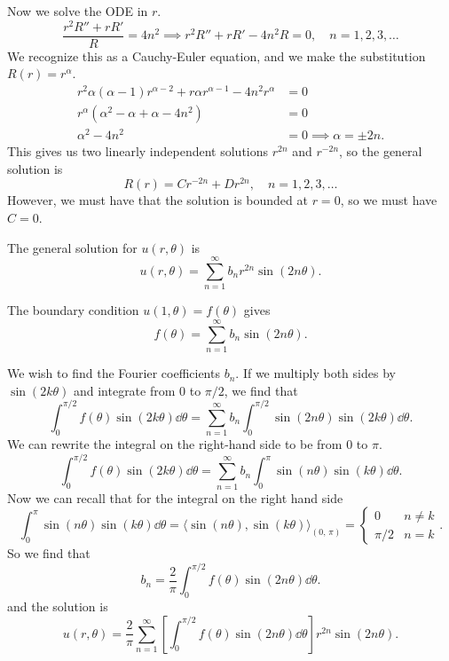\documentclass[plain]{pset}
\begin{document}
\begin{solution}
    Now we solve the ODE in \(r\).
    \[\frac{r^2R'' + rR'}{R} = 4n^2 \implies r^2R'' + rR' - 4n^2R = 0, \quad n = 1, 2, 3, \ldots\]
    We recognize this as a Cauchy-Euler equation, and we make the substitution \(R(r) = r^\alpha\).
    \begin{align*}
        r^2\alpha(\alpha - 1)r^{\alpha - 2} + r\alpha r^{\alpha - 1} - 4n^2r^\alpha &= 0 \\
        r^\alpha(\alpha^2 - \alpha + \alpha - 4n^2) &= 0 \\
        \alpha^2 - 4n^2 &= 0 \implies \alpha = \pm 2n.
    \end{align*}
    This gives us two linearly independent solutions \(r^{2n}\) and \(r^{-2n}\), so the general solution is
    \[R(r) = Cr^{-2n} + Dr^{2n}, \quad n = 1, 2, 3, \ldots\]
    However, we must have that the solution is bounded at \(r = 0\), so we must have \(C = 0\).

    The general solution for \(u(r, \theta)\) is
    \[u(r, \theta) = \sum_{n = 1}^\infty b_n r^{2n}\sin(2n\theta).\]

    The boundary condition \(u(1, \theta) = f(\theta)\) gives
    \[f(\theta) = \sum_{n = 1}^\infty b_n\sin(2n\theta).\]

    We wish to find the Fourier coefficients \(b_n\). If we multiply both sides by \(\sin(2k\theta)\) and integrate from \(0\) to \(\pi/2\), we find that
    \[\int_0^{\pi/2} f(\theta)\sin(2k\theta) \dd{\theta} = \sum_{n = 1}^\infty b_n\int_0^{\pi/2} \sin(2n\theta)\sin(2k\theta) \dd{\theta}.\]
    We can rewrite the integral on the right-hand side to be from \(0\) to \(\pi\).
    \[\int_0^{\pi/2} f(\theta)\sin(2k\theta) \dd{\theta} = \sum_{n = 1}^\infty b_n\int_0^{\pi} \sin(n\theta)\sin(k\theta) \dd{\theta}.\]
    Now we can recall that for the integral on the right hand side
    \[\int_0^\pi \sin(n\theta)\sin(k\theta) \dd{\theta} = \langle \sin(n\theta), \sin(k\theta) \rangle_{(0,\,\pi)} = \begin{cases} 0 & n \neq k \\ \pi/2 & n = k \end{cases}.\]
    So we find that
    \[b_n = \frac{2}{\pi}\int_0^{\pi/2} f(\theta)\sin(2n\theta) \dd{\theta}.\]
    and the solution is
    \[u(r, \theta) = \frac{2}{\pi}\sum_{n = 1}^\infty \left[\int_0^{\pi/2} f(\theta)\sin(2n\theta) \dd{\theta}\right] r^{2n}\sin(2n\theta).\]
\end{solution}

\pagebreak
\end{document}
